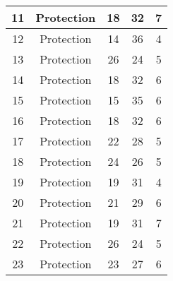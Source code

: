 \documentclass[results.tex]{subfiles}
\begin{document}
\begin{center}
\begin{tabular}{| c || c | c | c | c |}
            \hline
            11                      & Protection                   & 18                     & 32                      & 7                    \\
            \hline
            12                      & Protection                   & 14                     & 36                      & 4                    \\
            \hline
            13                      & Protection                   & 26                     & 24                      & 5                    \\
            \hline
            14                      & Protection                   & 18                     & 32                      & 6                    \\
            \hline
            15                      & Protection                   & 15                     & 35                      & 6                    \\
            \hline
            16                      & Protection                   & 18                     & 32                      & 6                    \\
            \hline
            17                      & Protection                   & 22                     & 28                      & 5                    \\
            \hline
            18                      & Protection                   & 24                     & 26                      & 5                    \\
            \hline
            19                      & Protection                   & 19                     & 31                      & 4                    \\
            \hline
            20                      & Protection                   & 21                     & 29                      & 6                    \\
            \hline
            21                      & Protection                   & 19                     & 31                      & 7                    \\
            \hline
            22                      & Protection                   & 26                     & 24                      & 5                    \\
            \hline
            23                      & Protection                   & 23                     & 27                      & 6                    \\

\end{tabular}
\end{center}
\end{document}
